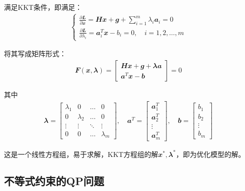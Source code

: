 满足KKT条件，即满足：
\begin{align}
  \begin{cases}
    \frac{\partial \mathbfit{L}}{\partial \mathbfit{x}}=\mathbfit{H}\mathbfit{x}+\mathbfit{g}+\sum_{i=1}^{m}\lambda_i\mathbfit{a}_i=0\\
    \frac{\partial \mathbfit{L}}{\partial \lambda_i}=\mathbfit{a}_i^T\mathbfit{x}-b_i=0, \quad i = 1, 2, \dots, m
  \end{cases}
\end{align}

将其写成矩阵形式：
\begin{align}
  \mathbfit{F}(\mathbfit{x},\mathbfit{\lambda})=\begin{bmatrix}
    \mathbfit{H}\mathbfit{x}+\mathbfit{g}+\mathbfit{\lambda}\mathbfit{a}\\
    \mathbfit{a}^T\mathbfit{x}-\mathbfit{b}
  \end{bmatrix} = 0
\end{align}

其中
\begin{align}
  \mathbfit{\lambda}=\begin{bmatrix}
    \lambda_1 & 0 & \dots & 0\\
    0 & \lambda_2 & \dots & 0\\
    \vdots & \vdots &\ddots & \vdots\\
    0 & 0 &\dots & \lambda_m
  \end{bmatrix}, \quad
  \mathbfit{a}^T=\begin{bmatrix}
    \mathbfit{a}_1^T \\ \mathbfit{a}_2^T \\ \vdots \\ \mathbfit{a}_m^T
  \end{bmatrix}, \quad
  \mathbfit{b}=\begin{bmatrix}
    b_1 \\ b_2 \\ \vdots \\ b_m 
  \end{bmatrix}
\end{align}

这是一个线性方程组，易于求解，KKT方程组的解$\mathbfit{x}^*, \mathbfit{\lambda}^*$，即为优化模型的解。




\subsection{不等式约束的QP问题}

